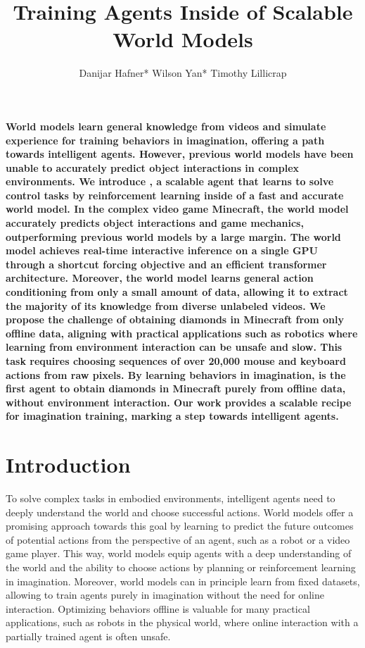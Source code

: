 \documentclass[11pt]{article}
\title{\vspace*{-1.7ex}Training Agents Inside of Scalable World Models\vspace*{-.2ex}}
\date{}
\author{%
Danijar Hafner*\quad
Wilson Yan*\quad
Timothy Lillicrap
}
\begin{document}
\maketitle
\pagestyle{fancy}

\vspace*{-2ex}
{\ignorespaces\bfseries%
World models learn general knowledge from videos and simulate experience for training behaviors in imagination, offering a path towards intelligent agents.
However, previous world models have been unable to accurately predict object interactions in complex environments.
We introduce \method, a scalable agent that learns to solve control tasks by reinforcement learning inside of a fast and accurate world model.
In the complex video game Minecraft, the world model accurately predicts object interactions and game mechanics, outperforming previous world models by a large margin.
The world model achieves real-time interactive inference on a single GPU through a shortcut forcing objective and an efficient transformer architecture.
Moreover, the world model learns general action conditioning from only a small amount of data, allowing it to extract the majority of its knowledge from diverse unlabeled videos.
We propose the challenge of obtaining diamonds in Minecraft from only offline data, aligning with practical applications such as robotics where learning from environment interaction can be unsafe and slow.
This task requires choosing sequences of over 20,000 mouse and keyboard actions from raw pixels.
By learning behaviors in imagination, \method is the first agent to obtain diamonds in Minecraft purely from offline data, without environment interaction.
Our work provides a scalable recipe for imagination training, marking a step towards intelligent agents.
}

\vfill
\vfill

\vfill
\clearpage

\section{Introduction}

To solve complex tasks in embodied environments, intelligent agents need to deeply understand the world and choose successful actions.
World models offer a promising approach towards this goal by learning to predict the future outcomes of potential actions from the perspective of an agent, such as a robot or a video game player.
This way, world models equip agents with a deep understanding of the world and the ability to choose actions by planning or reinforcement learning in imagination.
Moreover, world models can in principle learn from fixed datasets, allowing to train agents purely in imagination without the need for online interaction.
Optimizing behaviors offline is valuable for many practical applications, such as robots in the physical world, where online interaction with a partially trained agent is often unsafe.
\end{document}
